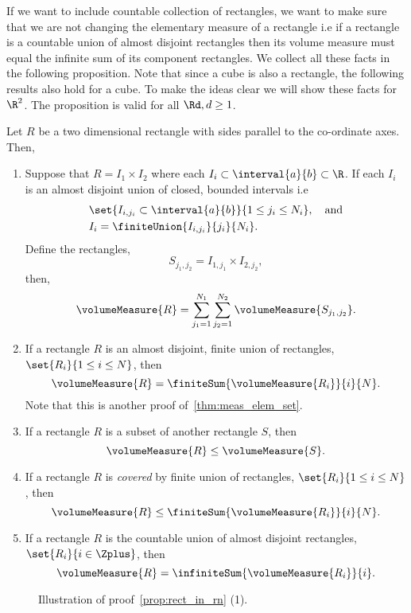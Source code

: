 If we want to include countable collection of rectangles, we want to make sure that we are not changing the
elementary measure of a rectangle i.e if a rectangle is a countable union of almost disjoint rectangles then
its volume measure must equal the infinite sum of its component rectangles.  We collect 
all these facts in the following proposition. Note that since a cube is also a rectangle, the following
results also hold for a cube. To make the ideas clear we will show these facts for
$\R^2$. The proposition is valid for all $\Rd,d\geq 1$.
\begin{Proposition}\label{prop:rect_in_rn}
    Let $R$ be a two dimensional rectangle with sides parallel to the co-ordinate axes. Then,
    \begin{enumerate}
	\item
	    Suppose that $R = I_1 \times I_2$ where each $I_i \subset \interval{a}{b} \subset \R$. 
	    If each $I_i$ is an almost disjoint union of closed, bounded intervals i.e
	    \begin{align*}
		&\set{I_{i,j_i} \subset \interval{a}{b}}{1\leq j_i \leq N_i}, \quad \text{and}\\
		& I_i = \finiteUnion{I_{i,j_i}}{j_i}{N_i}.
	    \end{align*}
	    Define the rectangles,
	    \[S_{j_1,j_2} = I_{1,j_1}\times I_{2,j_2},\]
	    then,
	    \[\volumeMeasure{R} = \sum\limits_{j_1 = 1}^{N_1}\sum\limits_{j_2 =
		    1}^{N_2}\volumeMeasure{S_{j_1,j_2}}.\]
	\item
	   If a rectangle $R$ is an almost disjoint, finite union of rectangles, $\set{R_i}{1\leq i
	       \leq N}$, then 
	   \[\volumeMeasure{R} = \finiteSum{\volumeMeasure{R_i}}{i}{N}.\] Note that this is another proof
	   of~\ref{thm:meas_elem_set}. 
       \item
	   If a rectangle $R$ is a subset of another rectangle $S$, then
	   \[\volumeMeasure{R} \leq \volumeMeasure{S}.\]
       \item
	   If a rectangle $R$ is \emph{covered} by finite union of rectangles, $\set{R_i}{1\leq i
	       \leq N}$, then 
	   \[\volumeMeasure{R} \leq \finiteSum{\volumeMeasure{R_i}}{i}{N}.\] 
       \item 
	   If a rectangle $R$ is the countable union of almost disjoint rectangles,
	   $\set{R_i}{i\in\Zplus}$, then 
	   \[\volumeMeasure{R} = \infiniteSum{\volumeMeasure{R_i}}{i}.\] 
    \end{enumerate}
\end{Proposition}
\begin{figure}
    
    \caption{Illustration of proof~\ref{prop:rect_in_rn} (1).}\label{fig:tikz:rectangles_rn}
\end{figure}
